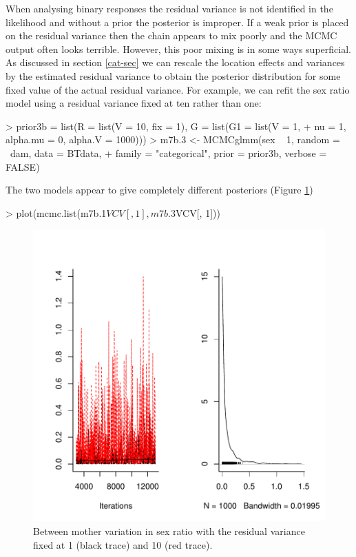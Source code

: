 \documentclass{article}
\begin{document}
When analysing binary responses the residual variance is not identified in the likelihood and without a prior the posterior is improper.  If a weak prior is placed on the residual variance then the chain appears to mix poorly and the MCMC output often looks terrible. However, this poor mixing is in some ways superficial. As discussed in section \ref{cat-sec} we can rescale the location effects and variances by the estimated residual variance to obtain the posterior distribution for some fixed value of the actual residual variance. For example, we can refit the sex ratio model using a residual variance fixed at ten rather than one:

\begin{Schunk}
\begin{Sinput}
> prior3b = list(R = list(V = 10, fix = 1), G = list(G1 = list(V = 1, 
+     nu = 1, alpha.mu = 0, alpha.V = 1000)))
> m7b.3 <- MCMCglmm(sex ~ 1, random = ~dam, data = BTdata, 
+     family = "categorical", prior = prior3b, verbose = FALSE)
\end{Sinput}
\end{Schunk}

The two models appear to give completely different posteriors (Figure \ref{sexratio2})

\begin{Schunk}
\begin{Sinput}
> plot(mcmc.list(m7b.1$VCV[, 1], m7b.3$VCV[, 1]))
\end{Sinput}
\end{Schunk}

\begin{figure}[!h]
\begin{center}
\includegraphics{Lecture8-021}
\end{center}
\caption{Between mother variation in sex ratio with the residual variance fixed at 1 (black trace) and 10 (red trace).}
\label{sexratio2}
\end{figure}
\end{document}
